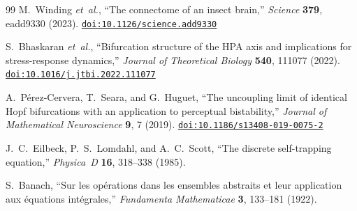 \documentclass[12pt,a4paper]{article}
\begin{document}
\begin{thebibliography}{99}
M.~Winding \textit{et~al.},
``The connectome of an insect brain,''
\textit{Science} \textbf{379}, eadd9330 (2023).
\href{https://doi.org/10.1126/science.add9330}{\nolinkurl{doi:10.1126/science.add9330}}

S.~Bhaskaran \textit{et~al.},
``Bifurcation structure of the HPA axis and implications for
stress-response dynamics,''
\textit{Journal of Theoretical Biology} \textbf{540}, 111077 (2022).
\href{https://doi.org/10.1016/j.jtbi.2022.111077}{\nolinkurl{doi:10.1016/j.jtbi.2022.111077}}

A.~P\'{e}rez-Cervera, T.~Seara, and G.~Huguet,
``The uncoupling limit of identical Hopf bifurcations with an
application to perceptual bistability,''
\textit{Journal of Mathematical Neuroscience} \textbf{9}, 7 (2019).
\href{https://doi.org/10.1186/s13408-019-0075-2}{\nolinkurl{doi:10.1186/s13408-019-0075-2}}

J.~C.~Eilbeck, P.~S.~Lomdahl, and A.~C.~Scott,
``The discrete self-trapping equation,''
\textit{Physica~D} \textbf{16}, 318--338 (1985).

S.~Banach,
``Sur les op\'{e}rations dans les ensembles abstraits et leur
application aux \'{e}quations int\'{e}grales,''
\textit{Fundamenta Mathematicae} \textbf{3}, 133--181 (1922).

\end{thebibliography}
\end{document}
